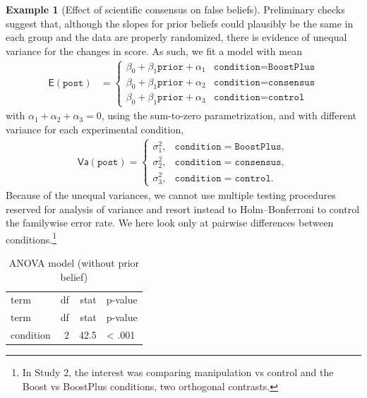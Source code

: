 \documentclass[
  11pt,
  letterpaper,
]{scrbook}
\theoremstyle{definition}
\theoremstyle{definition}
\newtheorem{example}{Example}[chapter]
\theoremstyle{remark}
\begin{document}
\begin{example}[Effect of scientific consensus on false
beliefs]
Preliminary checks suggest that, although the slopes for prior beliefs
could plausibly be the same in each group and the data are properly
randomized, there is evidence of unequal variance for the changes in
score. As such, we fit a model with mean \begin{align*}
\mathsf{E}(\texttt{post}) &= \begin{cases}
\beta_0 + \beta_1 \texttt{prior} + \alpha_1 &  \texttt{condition} = \texttt{BoostPlus}\\
\beta_0 + \beta_1 \texttt{prior} + \alpha_2 &\texttt{condition} = \texttt{consensus}\\
\beta_0 + \beta_1 \texttt{prior} + \alpha_3 &\texttt{condition} = \texttt{control}
\end{cases}
\end{align*} with \(\alpha_1 + \alpha_2 + \alpha_3=0\), using the
sum-to-zero parametrization, and with different variance for each
experimental condition, \begin{align*}
\mathsf{Va}(\texttt{post}) = \begin{cases}
\sigma^2_1, &  \texttt{condition} = \texttt{BoostPlus},\\
\sigma^2_2, &  \texttt{condition} = \texttt{consensus},\\
\sigma^2_3, & \texttt{condition} = \texttt{control}.
\end{cases}
\end{align*} Because of the unequal variances, we cannot use multiple
testing procedures reserved for analysis of variance and resort instead
to Holm--Bonferroni to control the familywise error rate. We here look
only at pairwise differences between conditions.\footnote{In Study 2,
  the interest was comparing manipulation vs control and the Boost vs
  BoostPlus conditions, two orthogonal contrasts.}

\begin{longtable}[]{@{}lrrl@{}}

\caption{\label{tbl-anovatabSSVB}Analysis of variance tables}

\tabularnewline

\caption{ANOVA model (without prior belief)}\tabularnewline
\toprule\noalign{}
term & df & stat & p-value \\
\midrule\noalign{}
\endfirsthead
\toprule\noalign{}
term & df & stat & p-value \\
\midrule\noalign{}
\endhead
\bottomrule\noalign{}
\endlastfoot
condition & 2 & 42.5 & \textless{} .001 \\


\end{longtable}
\end{example}
\end{document}

